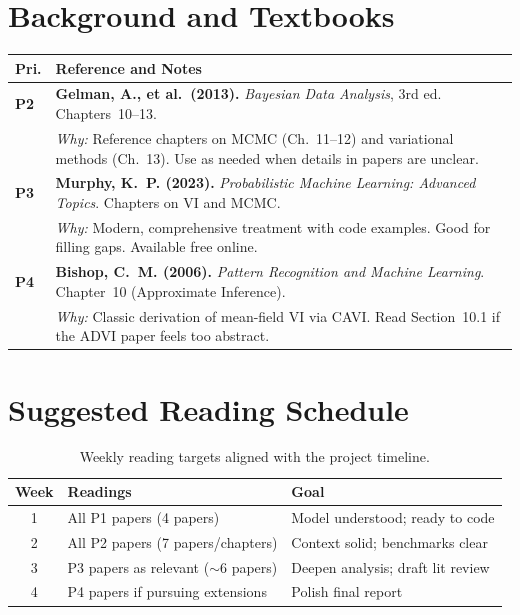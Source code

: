 \documentclass[11pt,a4paper]{article}
\begin{document}
\section{Background and Textbooks}

\begin{longtable}{@{}p{}p{}@{}}
\toprule
\textbf{Pri.} & \textbf{Reference and Notes} \\
\midrule
\endhead

\textcolor{P2}{\textbf{P2}} &
\textbf{Gelman, A., et al.\ (2013).} \textit{Bayesian Data Analysis}, 3rd ed. Chapters~10--13. \\
& \textit{Why:} Reference chapters on MCMC (Ch.~11--12) and variational methods (Ch.~13). Use as needed when details in papers are unclear. \\[0.8em]

\textcolor{P3}{\textbf{P3}} &
\textbf{Murphy, K.~P. (2023).} \textit{Probabilistic Machine Learning: Advanced Topics}. Chapters on VI and MCMC. \\
& \textit{Why:} Modern, comprehensive treatment with code examples. Good for filling gaps. Available free online. \\[0.8em]

\textcolor{P4}{\textbf{P4}} &
\textbf{Bishop, C.~M. (2006).} \textit{Pattern Recognition and Machine Learning}. Chapter~10 (Approximate Inference). \\
& \textit{Why:} Classic derivation of mean-field VI via CAVI. Read Section~10.1 if the ADVI paper feels too abstract. \\

\bottomrule
\end{longtable}


\section{Suggested Reading Schedule}

\begin{table}[h]
\centering
\begin{tabular}{@{}cll@{}}
\toprule
\textbf{Week} & \textbf{Readings} & \textbf{Goal} \\
\midrule
1 & All P1 papers (4 papers) & Model understood; ready to code \\
2 & All P2 papers (7 papers/chapters) & Context solid; benchmarks clear \\
3 & P3 papers as relevant ($\sim$6 papers) & Deepen analysis; draft lit review \\
4 & P4 papers if pursuing extensions & Polish final report \\
\bottomrule
\end{tabular}
\caption{Weekly reading targets aligned with the project timeline.}
\end{table}
\end{document}
